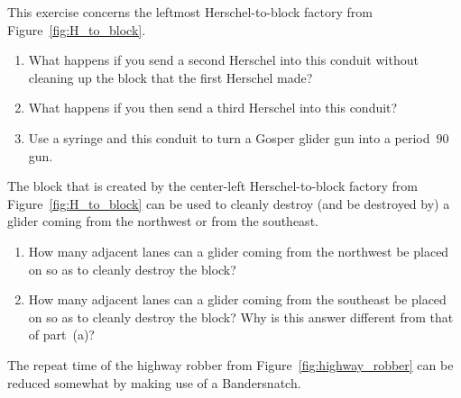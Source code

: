 \begin{multicols}{2}
	
	\mfilbreak
	
	
	\begin{problem}\label{exer:block_factory_is_tripler}
		This exercise concerns the leftmost Herschel-to-block factory from Figure~\ref{fig:H_to_block}.\smallskip
		
		\begin{enumerate}[label=\bf\color{ocre}(\alph*)]
			\item What happens if you send a second Herschel into this conduit without cleaning up the block that the first Herschel made?
			
			\item What happens if you then send a third Herschel into this conduit?
			
			\item Use a syringe and this conduit to turn a Gosper glider gun into a period~$90$ gun.
		\end{enumerate}
	\end{problem}
	
	
	\mfilbreak
	
	
	\begin{problem}\label{exer:block_factory_block_gliders}
		The block that is created by the center-left Herschel-to-block factory from Figure~\ref{fig:H_to_block} can be used to cleanly destroy (and be destroyed by) a glider coming from the northwest or from the southeast.
		
		\begin{enumerate}[label=\bf\color{ocre}(\alph*)]
			\item How many adjacent lanes can a glider coming from the northwest be placed on so as to cleanly destroy the block?
			
			\item How many adjacent lanes can a glider coming from the southeast be placed on so as to cleanly destroy the block? Why is this answer different from that of part~(a)?
		\end{enumerate}
	\end{problem}
	
	
	\mfilbreak
	
	
	\begin{problem}\label{exer:better_highway_robber_bandersnatch}
		The repeat time of the highway robber from Figure~\ref{fig:highway_robber} can be reduced somewhat by making use of a Bandersnatch.\smallskip
		

\end{problem}
\end{multicols}
